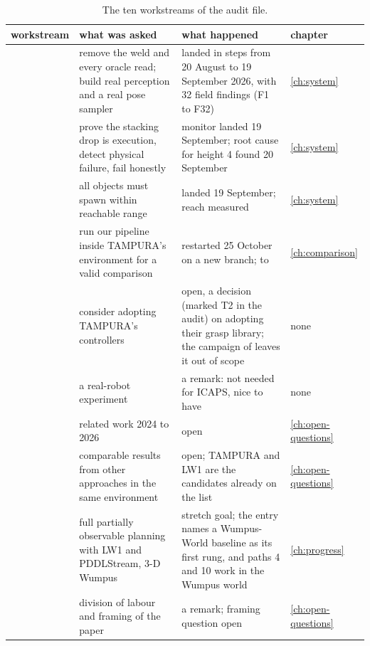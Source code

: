 \begin{table}[tbp]
\centering
\small
\begin{tabularx}{\textwidth}{@{}lYYl@{}}
\toprule
workstream & what was asked & what happened & chapter \\
\midrule
{} & remove the weld and every oracle read; build real perception and a real pose sampler & landed in steps from 20 August to 19 September 2026, with 32 field findings (F1 to F32) & \ref{ch:system} \\
 & prove the stacking drop is execution, detect physical failure, fail honestly & monitor landed 19 September; root cause for height 4 found 20 September & \ref{ch:system} \\
 & all objects must spawn within reachable range & landed 19 September; reach measured & \ref{ch:system} \\
 & run our pipeline inside TAMPURA's environment for a valid comparison & restarted 25 October on a new branch;  to  & \ref{ch:comparison} \\
 & consider adopting TAMPURA's controllers & open, a decision (marked T2 in the audit) on adopting their grasp library; the campaign of  leaves it out of scope & none \\
 & a real-robot experiment & a remark: not needed for ICAPS, nice to have & none \\
 & related work 2024 to 2026 & open & \ref{ch:open-questions} \\
 & comparable results from other approaches in the same environment & open; TAMPURA and LW1 are the candidates already on the list & \ref{ch:open-questions} \\
 & full partially observable planning with LW1 and PDDLStream, 3-D Wumpus & stretch goal; the entry names a Wumpus-World baseline as its first rung, and paths 4 and 10 work in the Wumpus world & \ref{ch:progress} \\
 & division of labour and framing of the paper & a remark; framing question open & \ref{ch:open-questions} \\
\bottomrule
\end{tabularx}
\caption{The ten workstreams of the audit file.}
\label{tab:asked-next}
\end{table}
